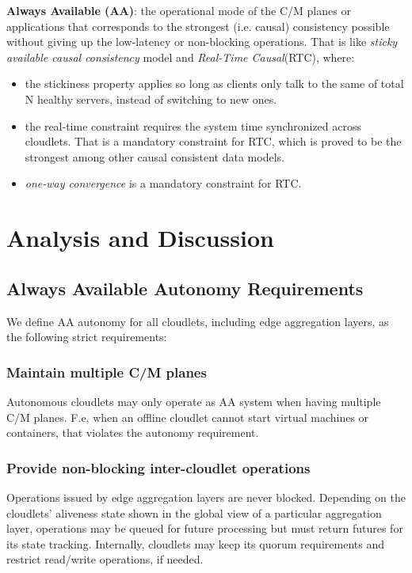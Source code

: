 \documentclass[conference]{IEEEtran}
\begin{document}
\textbf{Always Available (AA)}: the operational mode of the C/M planes or
applications that corresponds to the strongest (i.e. causal) consistency
possible without giving up the low-latency or non-blocking operations. That
is like \textit{sticky available causal consistency}\cite{b4} model and
\textit{Real-Time Causal}(RTC)\cite{b2}, where:
\begin{itemize}
  \item the stickiness property applies so long as clients only talk to the
    same of total $\mathrm{N}$ healthy servers, instead of switching to new
    ones.
  \item the real-time constraint requires the system time synchronized across
    cloudlets. That is a mandatory constraint for RTC, which is proved to be
    the strongest among other causal consistent data models.
  \item \textit{one-way convergence}\cite{b2} is a mandatory constraint for
    RTC.
\end{itemize}

\section{Analysis and Discussion}
\subsection{Always Available Autonomy Requirements}
We define AA autonomy for all cloudlets, including edge aggregation layers, as
the following strict requirements:

\subsubsection{Maintain multiple C/M planes}
Autonomous cloudlets may only operate as AA system when having multiple
C/M planes. F.e, when an offline cloudlet cannot start virtual machines
or containers, that violates the autonomy requirement.

\subsubsection{Provide non-blocking inter-cloudlet operations}
Operations issued by edge aggregation layers are never blocked. Depending on
the cloudlets' aliveness state shown in the global view of a particular
aggregation layer, operations may be queued for future processing but must
return futures for its state tracking. Internally, cloudlets may keep its
quorum requirements and restrict read/write operations, if needed.
\end{document}
